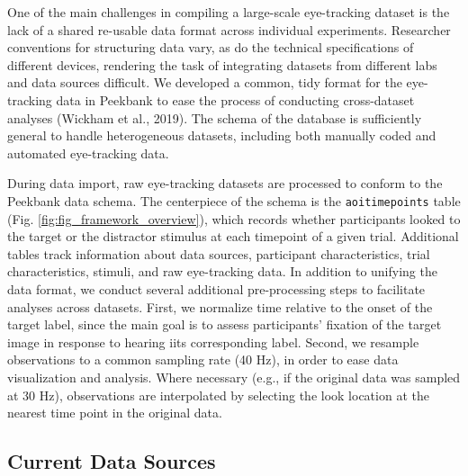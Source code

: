 \documentclass[10pt, letterpaper]{article}
\begin{document}
One of the main challenges in compiling a large-scale eye-tracking
dataset is the lack of a shared re-usable data format across individual
experiments. Researcher conventions for structuring data vary, as do the
technical specifications of different devices, rendering the task of
integrating datasets from different labs and data sources difficult. We
developed a common, tidy format for the eye-tracking data in Peekbank to
ease the process of conducting cross-dataset analyses (Wickham et al.,
2019). The schema of the database is sufficiently general to handle
heterogeneous datasets, including both manually coded and automated
eye-tracking data.

During data import, raw eye-tracking datasets are processed to conform
to the Peekbank data schema. The centerpiece of the schema is the
\texttt{aoi\textunderscore timepoints} table (Fig.
\ref{fig:fig_framework_overview}), which records whether participants
looked to the target or the distractor stimulus at each timepoint of a
given trial. Additional tables track information about data sources,
participant characteristics, trial characteristics, stimuli, and raw
eye-tracking data. In addition to unifying the data format, we conduct
several additional pre-processing steps to facilitate analyses across
datasets. First, we normalize time relative to the onset of the target
label, since the main goal is to assess participants' fixation of the
target image in response to hearing iits corresponding label. Second, we
resample observations to a common sampling rate (40 Hz), in order to
ease data visualization and analysis. Where necessary (e.g., if the
original data was sampled at 30 Hz), observations are interpolated by
selecting the look location at the nearest time point in the original
data.

\hypertarget{current-data-sources}{%
\subsection{Current Data Sources}\label{current-data-sources}}
\end{document}

